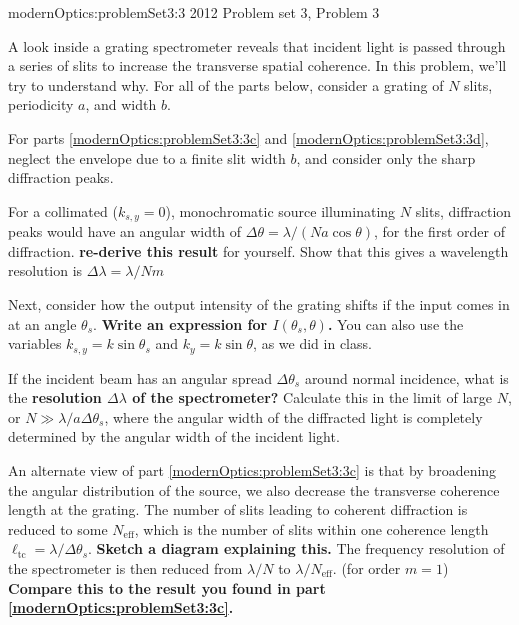 {modernOptics:problemSet3:3}
{2012 Problem set 3, Problem 3}
{
A look inside a grating spectrometer reveals that incident light is passed through a series of slits to increase the transverse spatial coherence. In this problem, we'll try to understand why. For all of the parts below, consider a grating of $N$ slits, periodicity $a$, and width $b$.

For parts \ref{modernOptics:problemSet3:3c} and \ref{modernOptics:problemSet3:3d}, neglect the envelope due to a finite slit width $b$, and consider only the sharp diffraction peaks.


For a collimated ($k_{s,y}=0$), monochromatic source illuminating $N$ slits, diffraction peaks would have an angular width of $\Delta \theta = \lambda / (N a \cos{\theta})$, for the first order of diffraction. {\bf re-derive this result} for yourself. Show that this gives a wavelength resolution is $\Delta \lambda = \lambda/N m$


Next, consider how the output intensity of the grating shifts if the input comes in at an angle $\theta_s$. {\bf Write an expression for $I(\theta_s, \theta)$.} You can also use the variables $k_{s,y}=k \sin \theta_s$ and $k_{y}=k \sin \theta$, as we did in class.

If the incident beam has an angular spread $\Delta \theta_s$ around normal incidence, what is the {\bf resolution $\Delta \lambda$ of the spectrometer?} Calculate this in the limit of large $N$, or $N \gg \lambda / a \Delta \theta_s$, where the angular width of the diffracted light is completely determined by the angular width of the incident light.


An alternate view of part \ref{modernOptics:problemSet3:3c} is that by broadening the angular distribution of the source, we also decrease the transverse coherence length at the grating. The number of slits leading to coherent diffraction is reduced to some $N_{\mathrm{eff}}$, which is the number of slits within one coherence length $\ell_{\mathrm{tc}} = \lambda / \Delta \theta_s$. {\bf Sketch a diagram explaining this.} The frequency resolution of the spectrometer is then reduced from $\lambda/N$ to $\lambda/N_{\mathrm{eff}}$. (for order $m=1$) {\bf Compare this to the result you found in part \ref{modernOptics:problemSet3:3c}.}

} %


